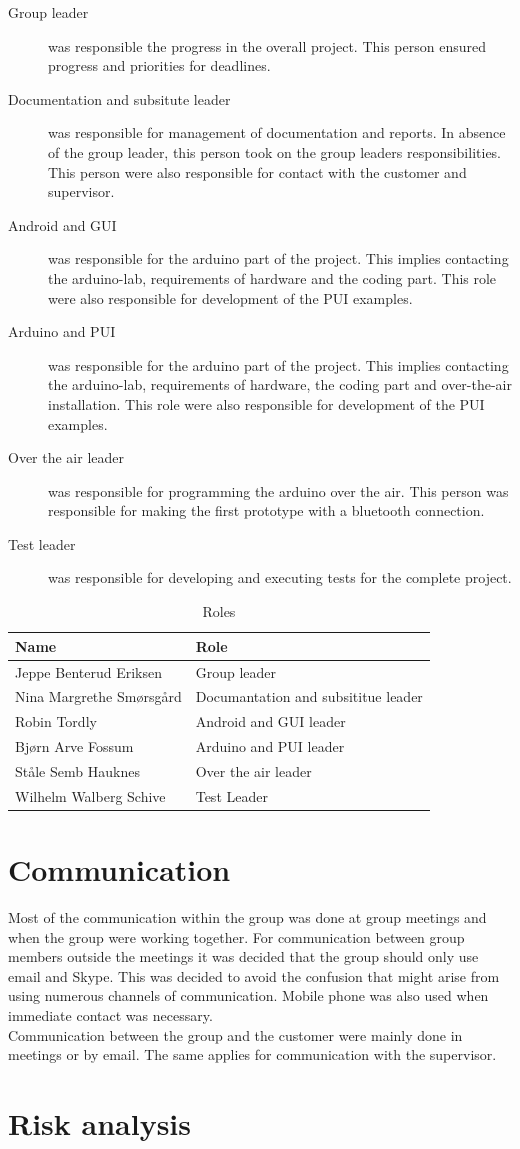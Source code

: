 \begin{description}
	\item[Group leader]{was responsible the progress in the overall project. This person ensured progress and priorities for deadlines.}
	\item[Documentation and subsitute leader]{was responsible for management of documentation and reports. In absence of the group leader, this person took on the group leaders responsibilities. This person were also responsible for contact with the customer and supervisor.}
	\item[Android and GUI]{was responsible for the arduino part of the project. This implies contacting the arduino-lab, requirements of hardware and the coding part. This role were also responsible for development of the PUI examples.}
	\item[Arduino and PUI]{was responsible for the arduino part of the project. This implies contacting the arduino-lab, requirements of hardware, the coding part and over-the-air installation. This role were also responsible for development of the PUI examples.}
	\item[Over the air leader]{was responsible for programming the arduino over the air. This person was responsible for making the first prototype with a bluetooth connection.}
	\item[Test leader]{was responsible for developing and executing tests for the complete project.}
\end{description}

\begin{table}
\begin{tabular}{|l|l|}
\hline
	{\bf Name} & {\bf Role}\\
\hline
	Jeppe Benterud Eriksen & Group leader\\
\hline
	Nina Margrethe Smørsgård & Documantation and subsititue leader\\
\hline
	Robin Tordly & Android and GUI leader\\
\hline
	Bjørn Arve Fossum & Arduino and PUI leader\\
\hline
	Ståle Semb Hauknes & Over the air leader\\
\hline
	Wilhelm Walberg Schive & Test Leader\\
\hline
\end{tabular}
\caption{Roles}
\end{table}

\section{Communication}
Most of the communication within the group was done at group meetings and when the group were working together. For communication between group members outside the meetings it was decided that the group should only use email and Skype. This was decided to avoid the confusion that might arise from using numerous channels of communication. Mobile phone was also used when immediate contact was necessary.\\
\newline
Communication between the group and the customer were mainly done in meetings or by email. The same applies for communication with the supervisor.

\section{Risk analysis}
